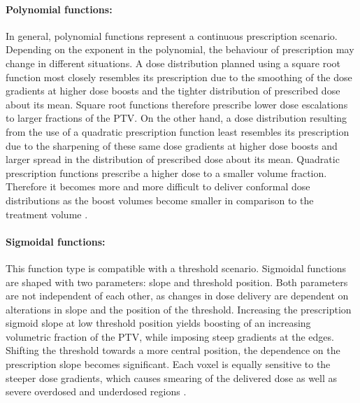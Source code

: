 \paragraph{Polynomial functions: }In general, polynomial functions represent a continuous prescription scenario. Depending on the exponent in the polynomial, the behaviour of prescription may change in different situations. A dose distribution planned using a square root function most closely resembles its prescription due to the smoothing of the dose gradients at higher dose boosts and the tighter distribution of prescribed dose about its mean. Square root functions therefore prescribe lower dose escalations to larger fractions of the PTV. On the other hand, a dose distribution resulting from the use of a quadratic prescription function least resembles its prescription due to the sharpening of these same dose gradients at higher dose boosts and larger spread in the distribution of prescribed dose about its mean. Quadratic prescription functions prescribe a higher dose to a smaller volume fraction. Therefore it becomes more and more difficult to deliver conformal dose distributions as the boost volumes become smaller in comparison to the treatment volume \cite{pmid17921573}.
\paragraph{Sigmoidal functions: }This function type is compatible with a threshold scenario. Sigmoidal functions are shaped with two parameters: slope and threshold position. Both parameters are not independent of each other, as changes in dose delivery are dependent on alterations in slope and the position of the threshold.  Increasing the prescription sigmoid slope at low threshold position yields boosting of an increasing volumetric fraction of the PTV, while imposing steep gradients at the edges. Shifting the threshold towards a more central position, the dependence on the prescription slope becomes significant. Each voxel is equally sensitive to the steeper dose gradients, which causes smearing of the delivered dose as well as severe overdosed and underdosed regions \cite{pmid17921573}. 
